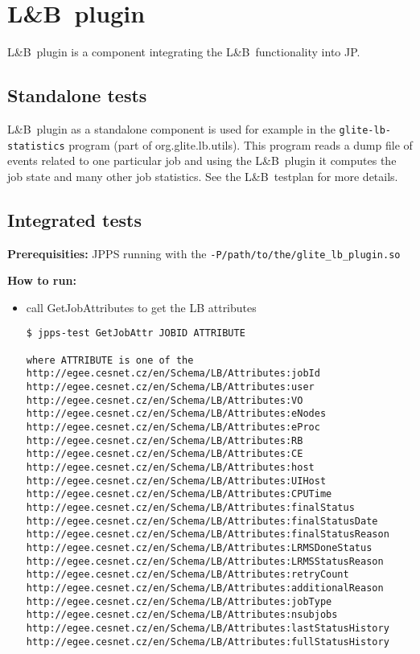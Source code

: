 \documentclass{egee}
\def\LB{L\&B}
\def\req{\noindent\textbf{Prerequisities: }}
\def\how{\noindent\textbf{How to run: }}
\def\todo#1{\textbf{TODO:} #1}
\begin{document}
\section{\LB\ plugin}
\LB\ plugin is a component integrating the \LB\ functionality into JP.


\subsection{Standalone tests}
\LB\ plugin as a standalone component is used for example in the \texttt{glite-lb-statistics} 
program (part of org.glite.lb.utils). This program reads a dump file of events related to
one particular job and using the \LB\ plugin it computes the job state and many other job 
statistics. See the \LB\ testplan for more details.

\subsection{Integrated tests}
\req JPPS running with the \texttt{-P/path/to/the/glite\_lb\_plugin.so}

\how 
\begin{itemize}
\item call GetJobAttributes to get the LB attributes
\begin{verbatim}
$ jpps-test GetJobAttr JOBID ATTRIBUTE

where ATTRIBUTE is one of the 
http://egee.cesnet.cz/en/Schema/LB/Attributes:jobId
http://egee.cesnet.cz/en/Schema/LB/Attributes:user
http://egee.cesnet.cz/en/Schema/LB/Attributes:VO
http://egee.cesnet.cz/en/Schema/LB/Attributes:eNodes
http://egee.cesnet.cz/en/Schema/LB/Attributes:eProc
http://egee.cesnet.cz/en/Schema/LB/Attributes:RB
http://egee.cesnet.cz/en/Schema/LB/Attributes:CE
http://egee.cesnet.cz/en/Schema/LB/Attributes:host
http://egee.cesnet.cz/en/Schema/LB/Attributes:UIHost
http://egee.cesnet.cz/en/Schema/LB/Attributes:CPUTime
http://egee.cesnet.cz/en/Schema/LB/Attributes:finalStatus
http://egee.cesnet.cz/en/Schema/LB/Attributes:finalStatusDate
http://egee.cesnet.cz/en/Schema/LB/Attributes:finalStatusReason
http://egee.cesnet.cz/en/Schema/LB/Attributes:LRMSDoneStatus
http://egee.cesnet.cz/en/Schema/LB/Attributes:LRMSStatusReason
http://egee.cesnet.cz/en/Schema/LB/Attributes:retryCount
http://egee.cesnet.cz/en/Schema/LB/Attributes:additionalReason
http://egee.cesnet.cz/en/Schema/LB/Attributes:jobType
http://egee.cesnet.cz/en/Schema/LB/Attributes:nsubjobs
http://egee.cesnet.cz/en/Schema/LB/Attributes:lastStatusHistory
http://egee.cesnet.cz/en/Schema/LB/Attributes:fullStatusHistory
\end{verbatim}
\end{itemize}
\end{document}
